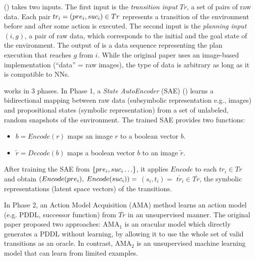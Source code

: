 \latentplanner () takes two inputs.
The first input is the \emph{transition input} $Tr$, a set of pairs of raw data.
Each pair $tr_i=(pre_i, suc_i) \in Tr$ represents a transition of the environment before and after some action is executed.
The second input is the \emph{planning input} $(i, g)$, a pair of raw data, which corresponds to the initial and the goal state of the environment.
The output of \latentplanner is a data sequence representing the plan execution that reaches $g$ from $i$.
While the original paper uses an image-based implementation (``data'' = raw images),
the type of data is arbitrary as long as it is compatible to NNs.


\latentplanner works in 3 phases.
In Phase 1, a \emph{State AutoEncoder} (SAE) () learns a bidirectional mapping between raw data (subsymbolic representation e.g., images)
 and propositional states (symbolic representation) from a set of unlabeled, random snapshots of the environment.
The trained SAE provides two functions:
\begin{itemize} %
\setlength{\itemsep}{-0.3em}
\item $b=Encode(r)$ maps an image  $r$ to a boolean vector $b$.
\item $\tilde{r}=Decode(b)$ maps a boolean vector $b$ to an image $\tilde{r}$.
\end{itemize}
After training the SAE from ${\left\{pre_i, suc_i\ldots\right\}}$,
it applies $Encode$ to each $tr_i \in Tr$ and obtain $(Encode(pre_i),$ $Encode(suc_i))=$ $(s_i,t_i)=$ $\overline{tr}_i\in \overline{Tr}$,
the symbolic representations (latent space vectors) of the transitions.

In Phase 2, an Action Model Acquisition (AMA) method learns an action model (e.g. PDDL, successor function) from $\overline{Tr}$ in an unsupervised manner.
The original paper proposed two approaches: AMA$_1$ is an oracular model which directly generates a PDDL without learning,
by allowing it to use the whole set of valid transitions as an oracle.
In contrast, AMA$_2$ is an unsupervised machine learning model that can learn from limited examples.

